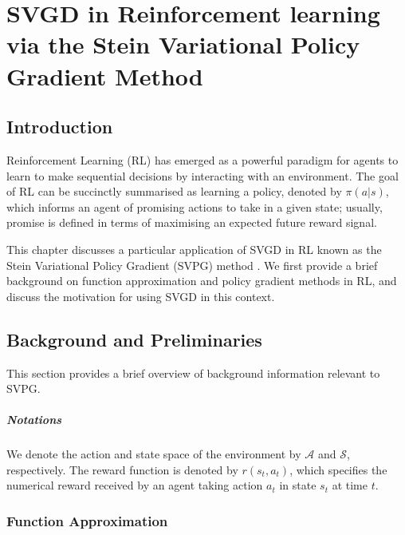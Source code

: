 \chapter{SVGD in Reinforcement learning via the Stein Variational Policy Gradient Method}
\label{chap:svpg}

\section{Introduction}

Reinforcement Learning (RL) has emerged as a powerful paradigm for agents to learn to make sequential decisions by interacting with an environment. The goal of RL can be succinctly summarised as learning a policy, denoted by $\pi(a|s)$, which informs an agent of promising actions to take in a given state; usually, promise is defined in terms of maximising an expected future reward signal.

This chapter discusses a particular application of SVGD in RL known as the Stein Variational Policy Gradient (SVPG) method \citep{liu_svpg}. We first provide a brief background on function approximation and policy gradient methods in RL, and discuss the motivation for using SVGD in this context.



\section{Background and Preliminaries}

This section provides a brief overview of background information relevant to SVPG.

\paragraph*{Notations} We denote the action and state space of the environment by $\mathcal{A}$ and $\mathcal{S}$, respectively. The reward function is denoted by $r(s_t, a_t)$, which specifies the numerical reward received by an agent taking action $a_t$ in state $s_t$ at time $t$. 


\subsection*{Function Approximation}


